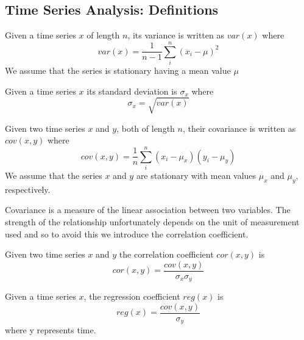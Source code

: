 \subsection{Time Series Analysis: Definitions}\label{subsec:tl_tsadefs}



\begin{definition}[Variance]\label{def:var}
\begin{rm}
Given a time series $x$ of length $n$, its variance is written as
$var(x)$ where
\[
var(x) = \frac{1}{n-1} \sum_i^n (x_i - \mu)^2
\]
We assume that the series is stationary having a mean value $\mu$
\end{rm}
\end{definition}


\begin{definition}\label{def:sd}
\begin{rm}
Given a time series $x$ its standard deviation is $\sigma_x$ where 
\[
\sigma_x = \sqrt{var(x)}
\]
\end{rm}
\end{definition}

\begin{definition}[Covariance]\label{def:covar}
\begin{rm}
Given two time series $x$ and $y$, both of length $n$, their
covariance is written as $cov(x,y)$ where
\[
cov(x,y) = \frac{1}{n} \sum_i^n (x_i - \mu_x) (y_i - \mu_y)
\]
We assume that the series $x$ and $y$ are stationary with mean values
$\mu_x$ and $\mu_y$, respectively.
\end{rm}
\end{definition}

Covariance is a measure of the linear association between two variables.
The strength of the relationship unfortunately depends on the unit of
measurement used and so to avoid this we introduce the correlation
coefficient.

\begin{definition}\label{def:correl}
\begin{rm}
Given two time series $x$ and $y$ the correlation coefficient
$cor(x,y)$ is
\[
cor(x,y) = \frac{cov(x,y)}{\sigma_x \sigma_y}
\]
\end{rm}
\end{definition}


\begin{definition}\label{def:regcoef}
\begin{rm}
Given a time series $x$, the regression coefficient
$reg(x)$ is
\[
reg(x) = \frac{cov(x,y)}{\sigma_y}
\]
where y represents time.
\end{rm}
\end{definition}

